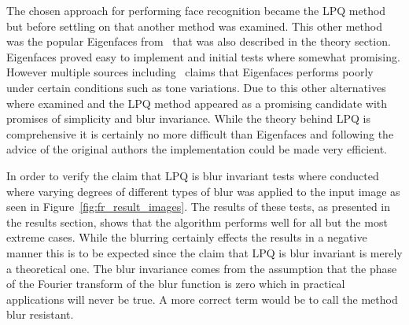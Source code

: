 
The chosen approach for performing face recognition became the LPQ method but before settling on that another method was examined. This other method was the popular Eigenfaces from~\cite{eigenface2} that was also described in the theory section. Eigenfaces proved easy to implement and initial tests where somewhat promising. However multiple sources including~\cite{belhumeur1997eigenfaces} claims that Eigenfaces performs poorly under certain conditions such as tone variations. Due to this other alternatives where examined and the LPQ method appeared as a promising candidate with promises of simplicity and blur invariance. While the theory behind LPQ is comprehensive it is certainly no more difficult than Eigenfaces and following the advice of the original authors the implementation could be made very efficient.

In order to verify the claim that LPQ is blur invariant tests where conducted where varying degrees of different types of blur was applied to the input image as seen in Figure~\ref{fig:fr_result_images}. The results of these tests, as presented in the results section, shows that the algorithm performs well for all but the most extreme cases. While the blurring certainly effects the results in a negative manner this is to be expected since the claim that LPQ is blur invariant is merely a theoretical one. The blur invariance comes from the assumption that the phase of the Fourier transform of the blur function is zero which in practical applications will never be true. A more correct term would be to call the method blur resistant.

